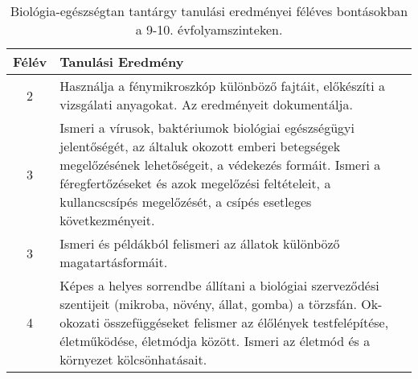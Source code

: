        
           \begin{longtable}{c | p{} }
            \caption[Biológia-egészségtan 9-10.]{Biológia-egészségtan tantárgy tanulási eredményei féléves bontásokban a 9-10. évfolyamszinteken. }  \\

            \textbf{Félév} & \textbf{Tanulási Eredmény} \\
            \hline
            \endhead
                                
                                          2 &  Használja a fénymikroszkóp különböző fajtáit, előkészíti a vizsgálati anyagokat. Az eredményeit dokumentálja. \\ \hline
                                      
                                
                                          3 &  Ismeri a vírusok, baktériumok biológiai egészségügyi jelentőségét, az általuk okozott emberi betegségek megelőzésének lehetőségeit, a védekezés formáit. Ismeri a féregfertőzéseket és azok megelőzési feltételeit, a kullancscsípés megelőzését, a csípés esetleges következményeit. \\ \hline
                                          3 &  Ismeri és példákból felismeri az állatok különböző magatartásformáit. \\ \hline
                                      
                                
                                          4 &  Képes a helyes sorrendbe állítani a biológiai szerveződési szentijeit (mikroba, növény, állat, gomba) a törzsfán. Ok-okozati összefüggéseket felismer az élőlények testfelépítése, életműködése, életmódja között. Ismeri az életmód és a környezet kölcsönhatásait. \\ \hline
                                      
                        \end{longtable}
            \clearpage

